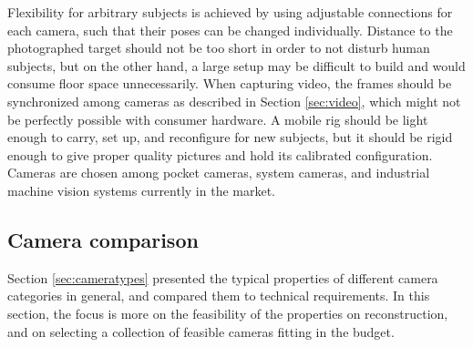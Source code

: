 Flexibility for arbitrary subjects is achieved by using adjustable connections for each camera, such that their poses can be changed individually.
Distance to the photographed target should not be too short in order to not disturb human subjects, but on the other hand, a large setup may be difficult to build and would consume floor space unnecessarily.
When capturing video, the frames should be synchronized among cameras as described in Section \ref{sec:video}, which might not be perfectly possible with consumer hardware.
A mobile rig should be light enough to carry, set up, and reconfigure for new subjects, but it should be rigid enough to give proper quality pictures and hold its calibrated configuration.
Cameras are chosen among pocket cameras, system cameras, and industrial machine vision systems currently in the market.


\subsection{Camera comparison} \label{sec:cameracomparison} %

Section \ref{sec:cameratypes} presented the typical properties of different camera categories in general, and compared them to technical requirements.
In this section, the focus is more on the feasibility of the properties on reconstruction, and on selecting a collection of feasible cameras fitting in the budget.

